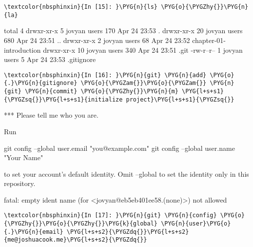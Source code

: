 \documentclass[letterpaper,10pt,english]{sphinxmanual}
\begin{document}
%
\begin{Verbatim}[commandchars=\\\{\}]
\textcolor{nbsphinxin}{In [15]: }\PYG{n}{ls} \PYG{o}{\PYGZhy{}}\PYG{n}{la}
\end{Verbatim}



%
\begin{OriginalVerbatim}[commandchars=\\\{\}]
total 4
drwxr-xr-x  5 jovyan users 170 Apr 24 23:53 .
drwxr-xr-x 20 jovyan users 680 Apr 24 23:51 ..
drwxr-xr-x  2 jovyan users  68 Apr 24 23:52 chapter-01-introduction
drwxr-xr-x 10 jovyan users 340 Apr 24 23:51 .git
-rw-r--r--  1 jovyan users   5 Apr 24 23:53 .gitignore
\end{OriginalVerbatim}
\relax

%
\begin{Verbatim}[commandchars=\\\{\}]
\textcolor{nbsphinxin}{In [16]: }\PYG{n}{git} \PYG{n}{add} \PYG{o}{.}\PYG{n}{gitignore} \PYG{o}{\PYGZam{}}\PYG{o}{\PYGZam{}} \PYG{n}{git} \PYG{n}{commit} \PYG{o}{\PYGZhy{}}\PYG{n}{m} \PYG{l+s+s1}{\PYGZsq{}}\PYG{l+s+s1}{initialize project}\PYG{l+s+s1}{\PYGZsq{}}
\end{Verbatim}



%
\begin{OriginalVerbatim}[commandchars=\\\{\}]

*** Please tell me who you are.

Run

  git config --global user.email "you@example.com"
  git config --global user.name "Your Name"

to set your account's default identity.
Omit --global to set the identity only in this repository.

fatal: empty ident name (for <jovyan@eb5eb401ee58.(none)>) not allowed
\end{OriginalVerbatim}
\relax

%
\begin{Verbatim}[commandchars=\\\{\}]
\textcolor{nbsphinxin}{In [17]: }\PYG{n}{git} \PYG{n}{config} \PYG{o}{\PYGZhy{}}\PYG{o}{\PYGZhy{}}\PYG{k}{global} \PYG{n}{user}\PYG{o}{.}\PYG{n}{email} \PYG{l+s+s2}{\PYGZdq{}}\PYG{l+s+s2}{me@joshuacook.me}\PYG{l+s+s2}{\PYGZdq{}}
\end{Verbatim}
\end{document}

